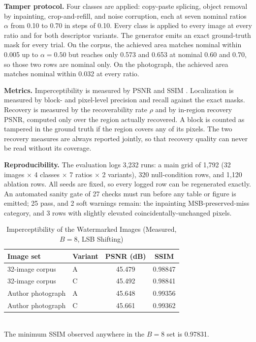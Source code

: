 \documentclass[conference]{IEEEtran}
\begin{document}
\textbf{Tamper protocol.} Four classes are applied: copy-paste splicing, object removal by inpainting, crop-and-refill, and noise corruption, each at seven nominal ratios $\alpha$ from 0.10 to 0.70 in steps of 0.10. Every class is applied to every image at every ratio and for both descriptor variants. The generator emits an exact ground-truth mask for every trial. On the corpus, the achieved area matches nominal within 0.005 up to $\alpha=0.50$ but reaches only 0.573 and 0.653 at nominal 0.60 and 0.70, so those two rows are nominal only. On the photograph, the achieved area matches nominal within 0.032 at every ratio.

\textbf{Metrics.} Imperceptibility is measured by PSNR and SSIM \cite{wang2004image}. Localization is measured by block- and pixel-level precision and recall against the exact masks. Recovery is measured by the recoverability rate $\rho$ and by in-region recovery PSNR, computed only over the region actually recovered. A block is counted as tampered in the ground truth if the region covers any of its pixels. The two recovery measures are always reported jointly, so that recovery quality can never be read without its coverage.

\textbf{Reproducibility.} The evaluation logs 3,232 runs: a main grid of 1,792 (32 images $\times$ 4 classes $\times$ 7 ratios $\times$ 2 variants), 320 null-condition rows, and 1,120 ablation rows. All seeds are fixed, so every logged row can be regenerated exactly. An automated sanity gate of 27 checks must run before any table or figure is emitted; 25 pass, and 2 soft warnings remain: the inpainting MSB-preserved-miss category, and 3 rows with slightly elevated coincidentally-unchanged pixels.

\begin{table}[t]
\caption{Imperceptibility of the Watermarked Images (Measured, $B=8$, LSB Shifting)}
\label{tab:imperc}
\centering
\begin{tabular}{llcc}
\toprule
Image set & Variant & PSNR (dB) & SSIM \\
\midrule
32-image corpus      & A & 45.479 & 0.98847 \\
32-image corpus      & C & 45.492 & 0.98841 \\
Author photograph    & A & 45.648 & 0.99356 \\
Author photograph    & C & 45.661 & 0.99362 \\
\bottomrule
\end{tabular}
\\[2pt]
\footnotesize The minimum SSIM observed anywhere in the $B=8$ set is 0.97831.
\end{table}
\end{document}
